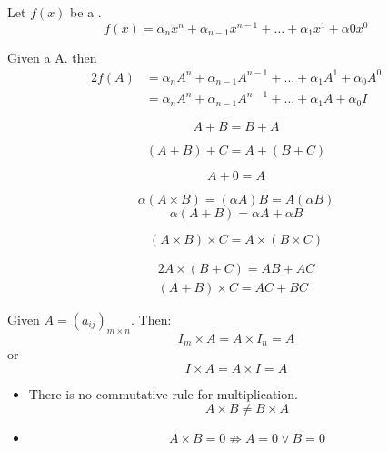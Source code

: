     \par Let $f(x)$ be a .
    \[
      f(x) = \alpha_{n}x^{n} + \alpha_{n - 1}x^{n - 1}
        + \ldots + \alpha_{1}x^{1} + \alpha{0}x^{0}
    \]
    \par Given a  A. then
    \begin{alignat*}{2}
      f(A) &= \alpha_{n}A^{n} + \alpha_{n - 1}A^{n - 1}
        + \ldots + \alpha_{1}A^{1} + \alpha_{0}A^{0} \\
      &= \alpha_{n}A^{n} + \alpha_{n - 1}A^{n - 1}
        + \ldots + \alpha_{1}A + \alpha_{0}I
    \end{alignat*}

      \[
        A + B = B + A
      \]

      \[
        (A + B) + C = A + (B + C)
      \]

      \[
        A + 0 = A
      \]

      \[
        \alpha (A \times B) = (\alpha A) B = A (\alpha B)
      \]
      \[
        \alpha (A + B) = \alpha A + \alpha B
      \]

      \[
        (A \times B) \times C = A \times (B \times C)
      \]

      \begin{alignat*}{2}
        A \times (B + C) = AB + AC \\
        (A + B) \times C = AC + BC
      \end{alignat*}

      \par Given $A = (a_{ij})_{m \times n}$. Then:
      \[
        I_{m} \times A = A \times I_{n} = A
      \]
      or
      \[
        I \times A = A \times I = A
      \]

      \begin{itemize}
        \item There is no commutative rule for multiplication.
          \[
            A \times B \neq B \times A
          \]
        \item
          \[
            A \times B = 0 \not \Rightarrow A = 0 \lor B = 0
          \]
      \end{itemize}

